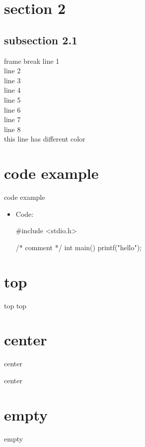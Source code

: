 \documentclass{beamer}
\begin{document}
\section{section 2}
\subsection{subsection 2.1}
\begin{frame}[allowframebreaks]{frame break}
  line 1\\
  line 2\\
  line 3\\
  line 4\\
  \framebreak
  line 5\\
  line 6\\
  line 7\\
  line 8\\
  {\color{MyRed} this line has different color}\\
\end{frame}

\section{code example}
\begin{frame}[fragile]{code example}
  \begin{itemize}
  \item Code:
    \smallskip
    \begin{ccode}
#include <stdio.h>

/* comment */
int main() {
  printf("hello\n");
}
    \end{ccode}
  \end{itemize}
\end{frame}

\section{top}
\begin{frame}[t]{top}
  top
\end{frame}

\section{center}
\begin{frame}[c]{center}
  \begin{center}
    center
  \end{center}
\end{frame}

\section{empty}
\begin{frame}{empty}
  ~
\end{frame}
\end{document}
